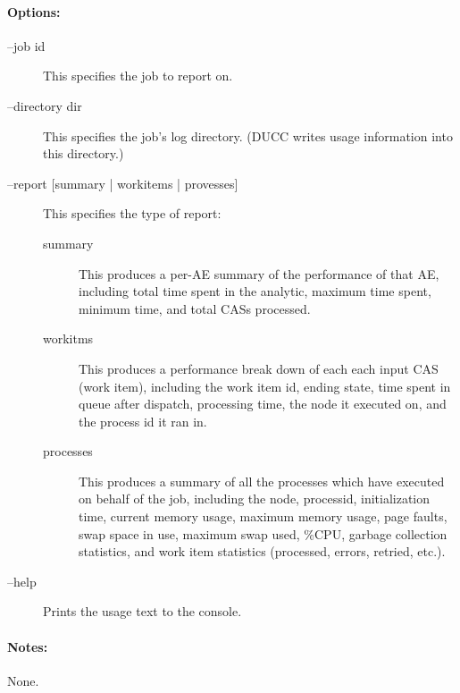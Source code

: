     \paragraph{Options:}
    \begin{description}
        \item[--job id] This specifies the job to report on.
        \item[--directory dir] This specifies the job's log directory. (DUCC writes usage information into this
          directory.)
        \item[--report {[summary | workitems | provesses]}]
          This specifies the type of report:
          \begin{description}
              \item[summary] This produces a per-AE summary of the performance of that AE, including
                total time spent in the analytic, maximum time spent, minimum time, and total CASs
                processed.
              \item[workitms] This produces a performance break down of each each input CAS (work
                item), including the work item id, ending state, time spent in queue after dispatch,
                processing time, the node it executed on, and the process id it ran in.
              \item[processes] This produces a summary of all the processes which have executed on
                behalf of the job, including the node, processid, initialization time, current memory usage,
                maximum memory usage, page faults, swap space in use, maximum swap used, \%CPU,
                garbage collection statistics, and work item statistics (processed, errors, retried, etc.).
          \end{description}
        \item[--help] Prints the usage text to the console. 
     \end{description}
        
    \paragraph{Notes:}
    None.

